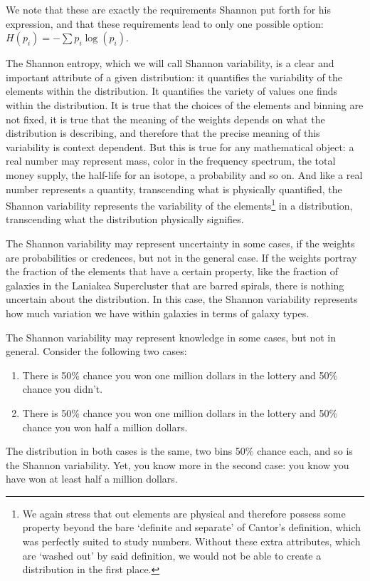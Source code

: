 \documentclass{article}
\begin{document}
We note that these are exactly the requirements Shannon put forth for his expression\cite{Shannon}, and that these requirements lead to only one possible option: $H(p_i) = - \sum p_i \log(p_i)$.

The Shannon entropy, which we will call Shannon variability, is a clear and important attribute of a given distribution: it quantifies the variability of the elements within the distribution. It quantifies the variety of values one finds within the distribution. It is true that the choices of the elements and binning are not fixed, it is true that the meaning of the weights depends on what the distribution is describing, and therefore that the precise meaning of this variability is context dependent. But this is true for any mathematical object: a real number may represent mass, color in the frequency spectrum, the total money supply, the half-life for an isotope, a probability and so on. And like a real number represents a quantity, transcending what is physically quantified, the Shannon variability represents the variability of the elements\footnote{We again stress that out elements are physical and therefore possess some property beyond the bare `definite and separate' of Cantor's definition, which was perfectly suited to study numbers. Without these extra attributes, which are `washed out' by said definition, we would not be able to create a distribution in the first place.} in a distribution, transcending what the distribution physically signifies.

The Shannon variability may represent uncertainty in some cases, if the weights are probabilities or credences, but not in the general case. If the weights portray the fraction of the elements that have a certain property, like the fraction of galaxies in the Laniakea Supercluster that are barred spirals, there is nothing uncertain about the distribution. In this case, the Shannon variability represents how much variation we have within galaxies in terms of galaxy types.

The Shannon variability may represent knowledge in some cases, but not in general. Consider the following two cases:
\begin{enumerate}
\item There is 50\% chance you won one million dollars in the lottery and 50\% chance you didn't.
\item There is 50\% chance you won one million dollars in the lottery and 50\% chance you won half a million dollars.
\end{enumerate}
The distribution in both cases is the same, two bins 50\% chance each, and so is the Shannon variability. Yet, you know more in the second case: you know you have won at least half a million dollars.
\end{document}
